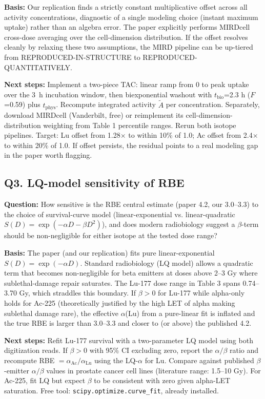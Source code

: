 \textbf{Basis:} Our replication finds a strictly constant multiplicative
offset across all activity concentrations, diagnostic of a single modeling
choice (instant maximum uptake) rather than an algebra error. The paper
explicitly performs MIRDcell cross-dose averaging over the cell-dimension
distribution. If the offset resolves cleanly by relaxing these two
assumptions, the MIRD pipeline can be up-tiered from
REPRODUCED-IN-STRUCTURE to REPRODUCED-QUANTITATIVELY.

\textbf{Next steps:} Implement a two-piece TAC: linear ramp from 0 to peak
uptake over the 3~h incubation window, then biexponential washout with
$t_{\text{bio}}$=2.3 h ($F$=0.59) plus $t_{\text{phys}}$. Recompute integrated
activity $\tilde{A}$ per concentration. Separately, download MIRDcell
(Vanderbilt, free) or reimplement its cell-dimension-distribution weighting
from Table 1 percentile ranges. Rerun both isotope pipelines. Target: Lu
offset from 1.28$\times$ to within 10\% of 1.0; Ac offset from 2.4$\times$ to
within 20\% of 1.0. If offset persists, the residual points to a real
modeling gap in the paper worth flagging.

\subsection*{Q3. LQ-model sensitivity of RBE}
\textbf{Question:} How sensitive is the RBE central estimate (paper 4.2, our
3.0--3.3) to the choice of survival-curve model (linear-exponential vs.
linear-quadratic $S(D) = \exp(-\alpha D - \beta D^2)$), and does modern
radiobiology suggest a $\beta$-term should be non-negligible for either
isotope at the tested dose range?

\textbf{Basis:} The paper (and our replication) fits pure linear-exponential
$S(D) = \exp(-\alpha D)$. Standard radiobiology (LQ model) allows a
quadratic term that becomes non-negligible for beta emitters at doses above
2--3 Gy where sublethal-damage repair saturates. The Lu-177 dose range in
Table 3 spans 0.74--3.70 Gy, which straddles this boundary. If $\beta > 0$
for Lu-177 while alpha-only holds for Ac-225 (theoretically justified by
the high LET of alpha making sublethal damage rare), the effective
$\alpha$(Lu) from a pure-linear fit is inflated and the true RBE is larger
than 3.0--3.3 and closer to (or above) the published 4.2.

\textbf{Next steps:} Refit Lu-177 survival with a two-parameter LQ model
using both digitization reads. If $\beta > 0$ with 95\% CI excluding zero,
report the $\alpha/\beta$ ratio and recompute RBE
$= \alpha_{\text{Ac}} / \alpha_{\text{Lu}}$ using the LQ-$\alpha$ for Lu.
Compare against published $\beta$-emitter $\alpha/\beta$ values in
prostate cancer cell lines (literature range: 1.5--10 Gy). For Ac-225,
fit LQ but expect $\beta$ to be consistent with zero given alpha-LET
saturation. Free tool: \texttt{scipy.optimize.curve\_fit}, already installed.

